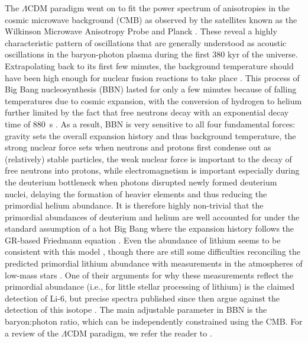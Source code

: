 \documentclass[fleqn,usenatbib,useAMS,onecolumn]{mnras} %
\begin{document}
The $\Lambda$CDM paradigm went on to fit the power spectrum of anisotropies in the cosmic microwave background (CMB) as observed by the satellites known as the Wilkinson Microwave Anisotropy Probe \citep[WMAP;][]{Spergel_2003} and Planck \citep{Planck_2014_cosmology}. These reveal a highly characteristic pattern of oscillations that are generally understood as acoustic oscillations in the baryon-photon plasma during the first 380 kyr of the universe. Extrapolating back to its first few minutes, the background temperature should have been high enough for nuclear fusion reactions to take place \citep*{Alpher_1948}. This process of Big Bang nucleosynthesis (BBN) lasted for only a few minutes because of falling temperatures due to cosmic expansion, with the conversion of hydrogen to helium further limited by the fact that free neutrons decay with an exponential decay time of 880~s \citep{Olive_2014}. As a result, BBN is very sensitive to all four fundamental forces: gravity sets the overall expansion history and thus background temperature, the strong nuclear force sets when neutrons and protons first condense out as (relatively) stable particles, the weak nuclear force is important to the decay of free neutrons into protons, while electromagnetism is important especially during the deuterium bottleneck when photons disrupted newly formed deuterium nuclei, delaying the formation of heavier elements and thus reducing the primordial helium abundance. It is therefore highly non-trivial that the primordial abundances of deuterium and helium are well accounted for under the standard assumption of a hot Big Bang where the expansion history follows the GR-based Friedmann equation \citep{Cyburt_2016}. Even the abundance of lithium seems to be consistent with this model \citep{Howk_2012, Fu_2015}, though there are still some difficulties reconciling the predicted primordial lithium abundance with measurements in the atmospheres of low-mass stars \citep[as reviewed in chapter 6 of][]{Merritt_2020}. One of their arguments for why these measurements reflect the primordial abundance (i.e., for little stellar processing of lithium) is the claimed detection of Li-6, but precise spectra published since then argue against the detection of this isotope \citep{Wang_2022_Li6}. The main adjustable parameter in BBN is the baryon:photon ratio, which can be independently constrained using the CMB. For a review of the $\Lambda$CDM paradigm, we refer the reader to \citet{Frenk_2012}.%
\end{document}

